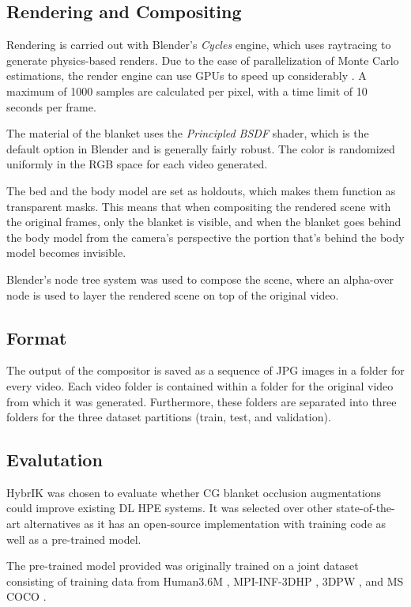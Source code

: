 \documentclass[conference]{IEEEtran}
\begin{document}
\subsection{Rendering and Compositing}
Rendering is carried out with Blender's \textit{Cycles} engine, which uses raytracing to generate physics-based renders. Due to the ease of parallelization of Monte Carlo estimations, the render engine can use GPUs to speed up considerably \cite{rayGems}. A maximum of 1000 samples are calculated per pixel, with a time limit of 10 seconds per frame.

The material of the blanket uses the \textit{Principled BSDF} shader, which is the default option in Blender and is generally fairly robust. The color is randomized uniformly in the RGB space for each video generated.

The bed and the body model are set as holdouts, which makes them function as transparent masks. This means that when compositing the rendered scene with the original frames, only the blanket is visible, and when the blanket goes behind the body model from the camera's perspective the portion that's behind the body model becomes invisible.

Blender's node tree system was used to compose the scene, where an alpha-over node is used to layer the rendered scene on top of the original video.


\subsection{Format} 
The output of the compositor is saved as a sequence of JPG images in a folder for every video. Each video folder is contained within a folder for the original video from which it was generated. Furthermore, these folders are separated into three folders for the three dataset partitions (train, test, and validation).


\subsection{Evalutation}
HybrIK \cite{hybrik} was chosen to evaluate whether CG blanket occlusion augmentations could improve existing DL HPE systems. It was selected over other state-of-the-art alternatives as it has an open-source implementation with training code as well as a pre-trained model. 

The pre-trained model provided was originally trained on a joint dataset consisting of training data from Human3.6M \cite{h36m}, MPI-INF-3DHP \cite{3dhp}, 3DPW \cite{3DPW}, and MS COCO \cite{mscoco}. 
\end{document}

